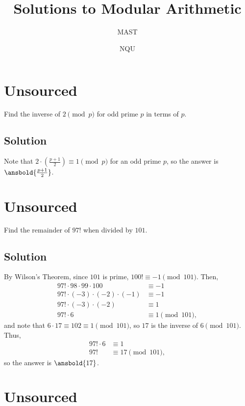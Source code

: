 \documentclass[mast]{lucky}
\title{Solutions to Modular Arithmetic}
\author{MAST}
\date{NQU}
\begin{document}
\maketitle

\toc

\pagebreak\section{Unsourced}

Find the inverse of $2\pmod {p}$ for odd prime $p$ in terms of $p.$

\subsection{Solution}

Note that $2\cdot \left(\frac{p + 1}{2}\right) \equiv 1 \pmod p$ for an odd prime $p$, so the answer is $\ansbold{\frac{p + 1}{2}}$. 

\pagebreak\section{Unsourced}

Find the remainder of $97!$ when divided by $101.$

\subsection{Solution}

By Wilson's Theorem, since $101$ is prime, $100! \equiv -1 \pmod{101}$. Then,
\begin{align*}
97! \cdot 98 \cdot 99 \cdot 100 &\equiv -1 \\
97! \cdot (-3) \cdot (-2) \cdot (-1) &\equiv -1 \\
97! \cdot (-3) \cdot (-2) &\equiv 1 \\
97! \cdot 6 &\equiv 1 \pmod{101},
\end{align*}
and note that $6 \cdot 17 \equiv 102 \equiv 1 \pmod{101}$, so $17$ is the inverse of $6 \pmod{101}$. Thus, 
\begin{align*}
97! \cdot 6 &\equiv 1 \\
97! &\equiv 17 \pmod{101},
\end{align*}
so the answer is $\ansbold{17}$.

\pagebreak\section{Unsourced}
\end{document}
